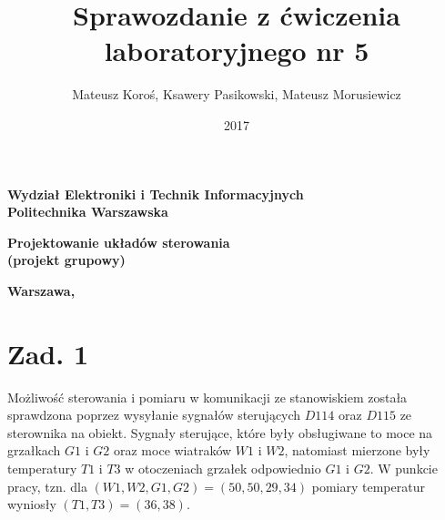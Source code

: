 \documentclass[a4paper,titlepage,11pt,twosides,floatssmall]{mwrep}
\begin{document}
\frenchspacing
\pagestyle{uheadings}

\title{\bf Sprawozdanie z ćwiczenia laboratoryjnego nr 5 \vskip 0.1cm}
\author{Mateusz Koroś, Ksawery Pasikowski, Mateusz Morusiewicz}
\date{2017}

\makeatletter
\renewcommand{\maketitle}{\begin{titlepage}
\begin{center}{\LARGE {\bf
Wydział Elektroniki i Technik Informacyjnych}}\\
\vspace{0.4cm}
{\LARGE {\bf Politechnika Warszawska}}\\
\vspace{0.3cm}
\end{center}
\vspace{5cm}
\begin{center}
{\bf \LARGE Projektowanie układów sterowania\\ (projekt grupowy) \vskip 0.1cm}
\end{center}
\vspace{1cm}
\begin{center}
{\bf \LARGE \@title}
\end{center}
\vspace{2cm}
\begin{center}
{\bf \Large \@author \par}
\end{center}
\vspace*{\stretch{6}}
\begin{center}
\bf{\large{Warszawa, \@date\vskip 0.1cm}}
\end{center}
\end{titlepage}
}
\makeatother

\maketitle

\tableofcontents


\chapter{Zad. 1}
Możliwość sterowania i pomiaru w komunikacji ze stanowiskiem została sprawdzona poprzez wysyłanie sygnałów sterujących $D114$ oraz $D115$ ze sterownika na obiekt. Sygnały sterujące, które były obsługiwane to moce na grzałkach $G1$ i $G2$ oraz moce wiatraków $ W1 $ i $ W2 $, natomiast mierzone były temperatury $ T1 $ i $ T3 $ w otoczeniach grzałek odpowiednio $ G1 $ i $ G2 $. W punkcie pracy, tzn. dla $ (W1, W2, G1, G2) = (50, 50, 29, 34) $ pomiary temperatur wyniosły $(T1, T3) = (36, 38)$.
\begingroup
\renewcommand{\cleardoublepage}{}
\renewcommand{\clearpage}{}
\end{document}
